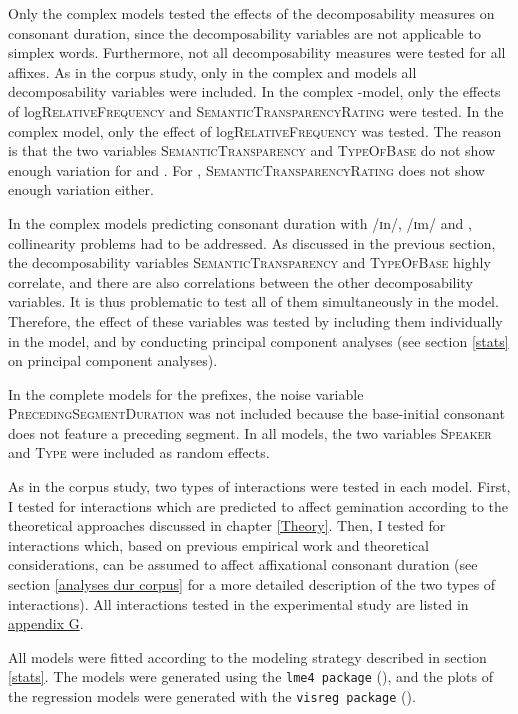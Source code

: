 Only the complex models tested the effects of the decomposability measures on consonant duration, since the decomposability variables are not applicable to simplex words.
Furthermore, not all decomposability measures were tested for all affixes. As in the corpus study, only in the complex   and models all decomposability variables were included. In the complex -model, only the effects of log\textsc{RelativeFrequency} and \textsc{SemanticTransparencyRating} were tested. In the complex model, only the effect of log\textsc{RelativeFrequency} was tested. The reason is that the two variables  \textsc{SemanticTransparency} and \textsc{TypeOfBase} do not show enough variation for  and . For , \textsc{SemanticTransparencyRating} does not show enough variation either.


In the complex models predicting consonant duration with /ɪn/, /ɪm/ and , collinearity problems had to be addressed. As discussed in the previous section, the decomposability variables \textsc{SemanticTransparency} and \textsc{TypeOfBase} highly correlate, and there are also correlations between the other decomposability variables. It is thus problematic to test all of them simultaneously in the model. Therefore, the effect of these variables was tested by including them individually in the model, and by conducting principal component analyses (see section \ref{stats} on principal component analyses). 

In the complete models for the prefixes, the noise variable \textsc{PrecedingSegmentDuration} was not included because the base-initial consonant does not feature a preceding segment. In all models, the two variables \textsc{Speaker} and \textsc{Type} were included as random effects.


As in the corpus study, two types of interactions were tested in each model. First, I tested for interactions which are predicted to affect gemination according to the theoretical approaches discussed in chapter \ref{Theory}. Then, I tested for interactions which, based on previous empirical work and theoretical considerations, can be assumed to affect affixational consonant duration  (see section \ref{analyses dur corpus} for a more detailed description of the two types of interactions). 
 All interactions tested in the experimental study are listed in \hyperref[Appendix G Summaries of tested interactions in experimental study]{appendix G}.

All models were fitted according to the modeling strategy described in section \ref{stats}.  
The models were generated using the \texttt{lme4 package} (\citealt{Bates.2014}), and the plots of the regression models were generated with the \texttt{visreg package} (\citealt{Breheny.2015}). 

